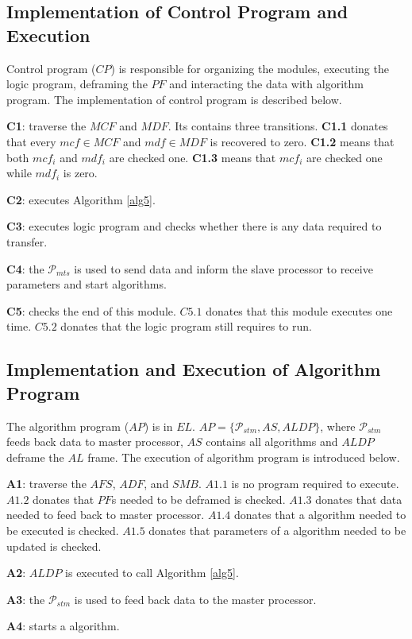 \documentclass[journal,UTF8]{IEEEtran}
\begin{document}
\subsection{Implementation of Control Program and Execution}
Control program ($CP$) is responsible for organizing the modules, executing the logic program, deframing the $PF$ and interacting the data with algorithm program. The implementation of control program is described below.

\textbf{C1}: traverse the $MCF$ and $MDF$. Its contains three transitions. \textbf{C1.1} donates that every $mcf\in MCF$ and $mdf \in MDF$ is recovered to zero. \textbf{C1.2} means that both $mcf_i$ and $mdf_i$ are checked one. \textbf{C1.3} means that $mcf_i$ are checked one while $mdf_i$ is zero.

\textbf{C2}: executes Algorithm \ref{alg5}. 

\textbf{C3}: executes logic program and checks whether there is any data required to transfer.  

\textbf{C4}: the $\mathcal{P}_{mts}$ is used to send data and inform the slave processor to receive parameters and start algorithms.   

\textbf{C5}: checks the end of this module. $C5.1$ donates that this module executes one time. $C5.2$ donates that the logic program still requires to run.  

\subsection{Implementation and Execution of Algorithm Program }
The algorithm program ($AP$) is in $EL$. $AP=\{\mathcal{P}_{stm}, AS, ALDP\}$, where $\mathcal{P}_{stm}$ feeds back data to master processor, $AS$ contains all algorithms and $ALDP$ deframe the $AL$ frame. The execution of algorithm program is introduced below.

\textbf{A1}: traverse the $AFS$, $ADF$, and $SMB$. $A1.1$ is no program required to execute. $A1.2$ donates that $PF$s needed to be deframed is checked. $A1.3$ donates that data needed to feed back to master processor. $A1.4$ donates that a algorithm needed to be executed is checked. $A1.5$ donates that parameters of a algorithm needed to be updated is checked.  

\textbf{A2}: $ALDP$ is executed to call Algorithm \ref{alg5}. 

\textbf{A3}: the $\mathcal{P}_{stm}$ is used to feed back data to the master processor. 

\textbf{A4}: starts a algorithm.
\end{document}
